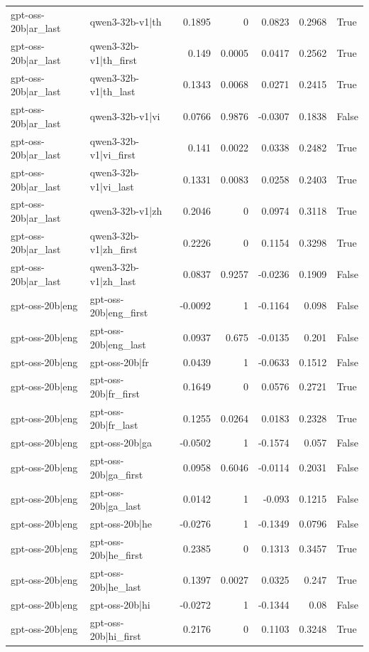 \begin{table}
\begin{tabular}{l l r r r r l}
gpt-oss-20b|ar_last & qwen3-32b-v1|th & 0.1895 & 0 & 0.0823 & 0.2968 & True \\
gpt-oss-20b|ar_last & qwen3-32b-v1|th_first & 0.149 & 0.0005 & 0.0417 & 0.2562 & True \\
gpt-oss-20b|ar_last & qwen3-32b-v1|th_last & 0.1343 & 0.0068 & 0.0271 & 0.2415 & True \\
gpt-oss-20b|ar_last & qwen3-32b-v1|vi & 0.0766 & 0.9876 & -0.0307 & 0.1838 & False \\
gpt-oss-20b|ar_last & qwen3-32b-v1|vi_first & 0.141 & 0.0022 & 0.0338 & 0.2482 & True \\
gpt-oss-20b|ar_last & qwen3-32b-v1|vi_last & 0.1331 & 0.0083 & 0.0258 & 0.2403 & True \\
gpt-oss-20b|ar_last & qwen3-32b-v1|zh & 0.2046 & 0 & 0.0974 & 0.3118 & True \\
gpt-oss-20b|ar_last & qwen3-32b-v1|zh_first & 0.2226 & 0 & 0.1154 & 0.3298 & True \\
gpt-oss-20b|ar_last & qwen3-32b-v1|zh_last & 0.0837 & 0.9257 & -0.0236 & 0.1909 & False \\
gpt-oss-20b|eng & gpt-oss-20b|eng_first & -0.0092 & 1 & -0.1164 & 0.098 & False \\
gpt-oss-20b|eng & gpt-oss-20b|eng_last & 0.0937 & 0.675 & -0.0135 & 0.201 & False \\
gpt-oss-20b|eng & gpt-oss-20b|fr & 0.0439 & 1 & -0.0633 & 0.1512 & False \\
gpt-oss-20b|eng & gpt-oss-20b|fr_first & 0.1649 & 0 & 0.0576 & 0.2721 & True \\
gpt-oss-20b|eng & gpt-oss-20b|fr_last & 0.1255 & 0.0264 & 0.0183 & 0.2328 & True \\
gpt-oss-20b|eng & gpt-oss-20b|ga & -0.0502 & 1 & -0.1574 & 0.057 & False \\
gpt-oss-20b|eng & gpt-oss-20b|ga_first & 0.0958 & 0.6046 & -0.0114 & 0.2031 & False \\
gpt-oss-20b|eng & gpt-oss-20b|ga_last & 0.0142 & 1 & -0.093 & 0.1215 & False \\
gpt-oss-20b|eng & gpt-oss-20b|he & -0.0276 & 1 & -0.1349 & 0.0796 & False \\
gpt-oss-20b|eng & gpt-oss-20b|he_first & 0.2385 & 0 & 0.1313 & 0.3457 & True \\
gpt-oss-20b|eng & gpt-oss-20b|he_last & 0.1397 & 0.0027 & 0.0325 & 0.247 & True \\
gpt-oss-20b|eng & gpt-oss-20b|hi & -0.0272 & 1 & -0.1344 & 0.08 & False \\
gpt-oss-20b|eng & gpt-oss-20b|hi_first & 0.2176 & 0 & 0.1103 & 0.3248 & True \\

\end{tabular}
\end{table}
